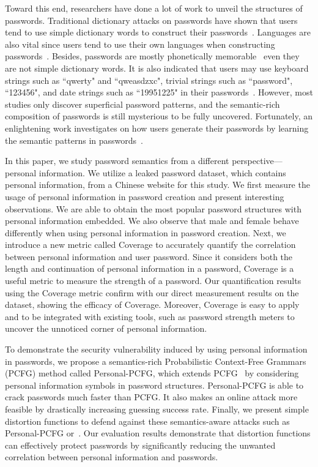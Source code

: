 Toward this end, researchers have done a lot of work to unveil the
structures of passwords. Traditional dictionary attacks on passwords
have shown that users tend to use simple dictionary words to construct
their passwords~\cite{hellman1980cryptanalytic,
  morris1979password}. Languages are also vital since users tend to
use their own languages when constructing
passwords~\cite{bonneau2012science}. Besides, passwords are mostly
phonetically memorable~\cite{narayanan2005fast} even they are not
simple dictionary words. It is also indicated that users may use
keyboard strings such as ``qwerty" and ``qweasdzxc", trivial strings
such as ``password", ``123456", and date strings such as ``19951225"
in their passwords~\cite{li2014large, schweitzer2009visualizing,
  veras2012visualizing}. However, most studies only discover
superficial password patterns, and the semantic-rich composition of
passwords is still mysterious to be fully uncovered. Fortunately, an
enlightening work investigates on how users generate their passwords
by learning the semantic patterns in
passwords~\cite{veras2014semantic}.

In this paper, we study password semantics from a different
perspective---personal information.  We utilize a leaked password
dataset, which contains personal information, from a Chinese website
for this study.  We first measure the usage of personal information in
password creation and present interesting observations. We are able to
obtain the most popular password structures with personal information
embedded. We also observe that male and female behave differently when
using personal information in password creation. Next, we introduce a
new metric called Coverage to accurately quantify the correlation
between personal information and user password. Since it considers
both the length and continuation of personal information in a
password, Coverage is a useful metric to measure the strength of a
password. Our quantification results using the Coverage metric confirm
with our direct measurement results on the dataset, showing the
efficacy of Coverage.  Moreover, Coverage is easy to apply and to be integrated with existing tools, such as password strength
meters to uncover the unnoticed corner of personal information.

To demonstrate the security vulnerability induced by using personal
information in passwords, we propose a semantics-rich Probabilistic Context-Free
Grammars (PCFG) method called Personal-PCFG, which extends PCFG~\cite{weir2009password} by considering personal
information symbols in password structures. Personal-PCFG is able to
crack passwords much faster than PCFG. It also makes an online attack
more feasible by drastically increasing guessing success rate. Finally, we present simple distortion
functions to defend against these semantics-aware attacks such as
Personal-PCFG or~\cite{veras2014semantic}. Our evaluation results
demonstrate that distortion functions can effectively protect
passwords by significantly reducing the unwanted correlation between
personal information and passwords.


